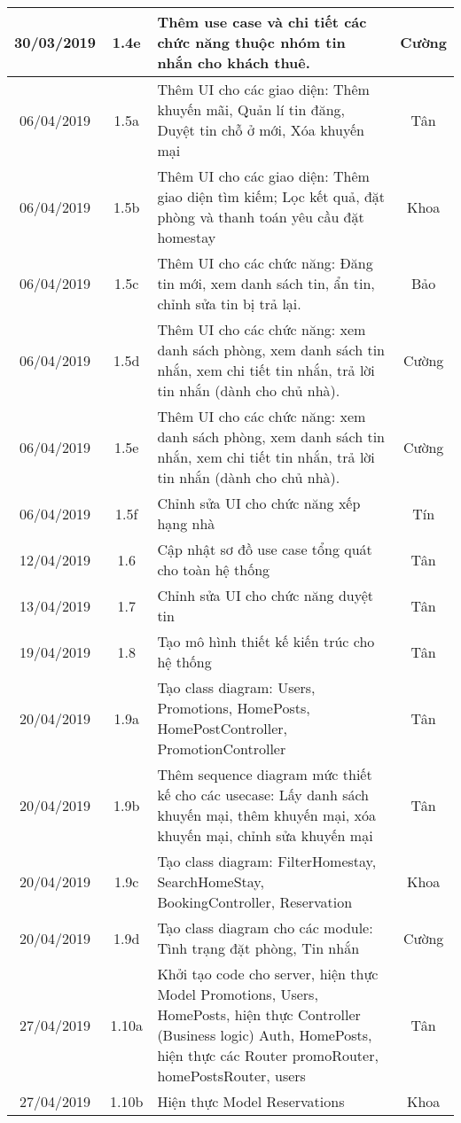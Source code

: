\begin{center}
\begin{longtable}{ | c | c | p{5cm} |c|}
		30/03/2019 & 1.4e & Thêm use case và chi tiết các chức năng thuộc nhóm tin nhắn cho khách thuê. & Cường \\ \hline
		
		06/04/2019 & 1.5a & Thêm UI cho các giao diện: Thêm khuyến mãi, Quản lí tin đăng, Duyệt tin chỗ ở mới, Xóa khuyến mại & Tân \\ \hline 
		06/04/2019 & 1.5b & Thêm UI cho các giao diện: Thêm giao diện tìm kiếm; Lọc kết quả, đặt phòng và thanh toán yêu cầu đặt homestay & Khoa \\ \hline
		06/04/2019 & 1.5c & Thêm UI cho các chức năng: Đăng tin mới, xem danh sách tin, ẩn tin, chỉnh sửa tin bị trả lại. & Bảo \\ \hline
		06/04/2019 & 1.5d & Thêm UI cho các chức năng: xem danh sách phòng, xem danh sách tin nhắn, xem chi tiết tin nhắn, trả lời tin nhắn (dành cho chủ nhà). & Cường \\ \hline
		06/04/2019 & 1.5e & Thêm UI cho các chức năng: xem danh sách phòng, xem danh sách tin nhắn, xem chi tiết tin nhắn, trả lời tin nhắn (dành cho chủ nhà). & Cường \\ \hline
		06/04/2019 & 1.5f & Chỉnh sửa UI cho chức năng xếp hạng nhà & Tín \\ \hline
		12/04/2019 & 1.6 & Cập nhật sơ đồ use case tổng quát cho toàn hệ thống & Tân \\ \hline
		13/04/2019 & 1.7 & Chỉnh sửa UI cho chức năng duyệt tin & Tân \\ \hline
		19/04/2019 & 1.8 & Tạo mô hình thiết kế kiến trúc cho hệ thống & Tân \\ \hline
		20/04/2019 & 1.9a & Tạo class diagram: Users, Promotions, HomePosts, HomePostController, PromotionController & Tân \\ \hline
		20/04/2019 & 1.9b & Thêm sequence diagram mức thiết kế cho các usecase: Lấy danh sách khuyến mại, thêm khuyến mại, xóa khuyến mại, chỉnh sửa khuyến mại & Tân \\ \hline
		20/04/2019 & 1.9c & Tạo class diagram: FilterHomestay, SearchHomeStay, BookingController, Reservation & Khoa \\ \hline
		20/04/2019 & 1.9d & Tạo class diagram cho các module: Tình trạng đặt phòng, Tin nhắn & Cường \\ \hline
		27/04/2019 & 1.10a & Khởi tạo code cho server, hiện thực Model Promotions, Users, HomePosts, hiện thực Controller (Business logic) Auth, HomePosts, hiện thực các Router promoRouter, homePostsRouter, users  & Tân \\ \hline
		27/04/2019 & 1.10b & Hiện thực Model Reservations  & Khoa \\ \hline

\end{longtable}
\end{center}
